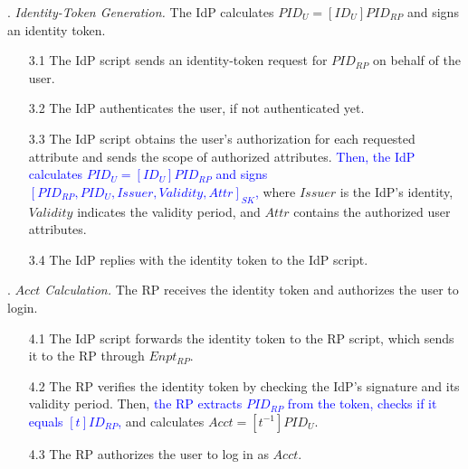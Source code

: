 . {\em Identity-Token Generation.}
The IdP calculates $PID_U = [ID_U]{PID_{RP}}$ and signs an identity token. %
\vspace{-\topsep}
\begin{itemize}
\setlength{\topsep}{0pt}
\setlength{\partopsep}{0pt}
\setlength{\itemsep}{0pt}
\setlength{\parsep}{0pt}
\setlength{\parskip}{0pt}
\item[3.1]
The IdP script sends an identity-token request for $PID_{RP}$ on behalf of the user. %

\item[3.2] The IdP authenticates the user, if not authenticated yet.

\item [3.3]
The IdP script obtains the user's authorization for each requested attribute and sends the scope of authorized attributes. %
\textcolor{blue}{Then, the IdP %
    calculates $PID_U = [ID_U]{PID_{RP}}$ %
and signs $[PID_{RP}, PID_U, Issuer, Validity, Attr]_{SK}$,}
 where $Issuer$ is the IdP's identity, $Validity$ indicates the validity period, and $Attr$ contains the authorized user attributes.
\item[3.4] The IdP replies with the identity token to the IdP script.
\end{itemize}

. {\em $Acct$ Calculation.}
The RP receives the identity token and authorizes the user to login.
\vspace{-\topsep}
\begin{itemize}
\setlength{\topsep}{0pt}
\setlength{\partopsep}{0pt}
\setlength{\itemsep}{0pt}
\setlength{\parsep}{0pt}
\setlength{\parskip}{0pt}
\item [4.1]
The IdP script forwards the identity token to the RP script,
    which sends it to the RP through $Enpt_{RP}$.
\item[4.2] The RP verifies the identity token by checking the IdP's signature and its validity period.
Then, \textcolor{blue}{the RP extracts $PID_{RP}$ from the token, checks if it equals $[t]ID_{RP}$,}
and calculates $Acct = [t^{-1}]{PID_U}$.

\item [4.3] The RP authorizes the user to log in as $Acct$.

\end{itemize}


